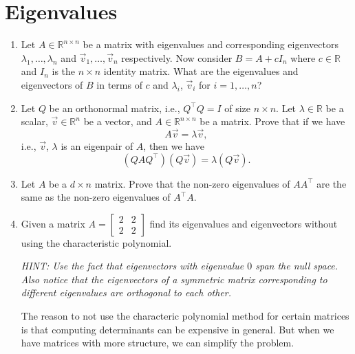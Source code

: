 \documentclass[10pt]{article}
\newcommand{\RR}{\mathbb{R}}
\begin{document}
\newpage

\section{Eigenvalues}

\begin{enumerate}[label=(\alph*)]
    \item Let $A \in \RR^{n \times n}$ be a matrix with eigenvalues and corresponding eigenvectors $\lambda_1, \ldots, \lambda_n$ and $\vec{v}_1, \ldots, \vec{v}_n$ respectively. Now consider $B = A + cI_n$ where $c \in \RR$ and $I_n$ is the $n \times n$ identity matrix. What are the eigenvalues and eigenvectors of $B$ in terms of $c$ and $\lambda_i$, $\vec{v}_i$ for $i = 1, \ldots, n$?

    \vspace{4cm}

    \item Let $Q$ be an orthonormal matrix, i.e., $Q^\top Q = I$ of size $n \times n$. Let $\lambda \in \RR$ be a scalar, $\vec{v} \in \RR^n$ be a vector, and $A \in \RR^{n \times n}$ be a matrix. Prove that if we have
    \begin{equation}
        A\vec{v} = \lambda \vec{v},
    \end{equation}
    i.e., $\vec{v}$, $\lambda$ is an eigenpair of $A$, then we have
    \begin{equation}
        (QAQ^\top)(Q\vec{v}) = \lambda(Q\vec{v}).
    \end{equation}

    \vspace{4cm}

    \item Let $A$ be a $d \times n$ matrix. Prove that the non-zero eigenvalues of $AA^\top$ are the same as the non-zero eigenvalues of $A^\top A$.

    \vspace{4cm}

    \item Given a matrix $A = \begin{bmatrix} 2 & 2 \\ 2 & 2 \end{bmatrix}$ find its eigenvalues and eigenvectors without using the characteristic polynomial.

    \textit{HINT: Use the fact that eigenvectors with eigenvalue $0$ span the null space. Also notice that the eigenvectors of a symmetric matrix corresponding to different eigenvalues are orthogonal to each other.}

    \vspace{3cm}

    The reason to not use the characteric polynomial method for certain matrices is that computing determinants can be expensive in general. But when we have matrices with more structure, we can simplify the problem.
\end{enumerate}
\end{document}
